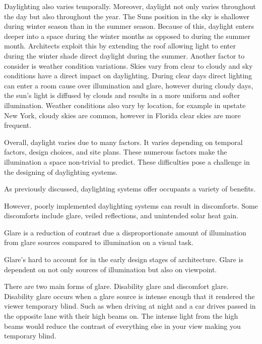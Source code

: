 Daylighting also varies temporally.
Moreover, daylight not only varies throughout the day but also throughout the year.
The Suns position in the sky is shallower during winter season than in the summer season. Because of this, daylight enters deeper into a space during the winter months as opposed to during the summer month.
Architects exploit this by extending the roof allowing light to enter during the winter shade direct daylight during the summer.
Another factor to consider is weather condition variations. Skies vary from clear to cloudy and sky conditions have a direct impact on daylighting. During clear days direct lighting can enter a room cause over illumination and glare, however during cloudy days, the sun's light is diffused by clouds and results in a more uniform and softer illumination.
Weather conditions also vary by location, for example in upstate New York, cloudy skies are common, however in Florida clear skies are more frequent.

Overall, daylight varies due to many factors. It varies depending on temporal factors, design choices, and site plans. These numerous factors make the illumination a space non-trivial to predict. These difficulties pose a challenge in the designing of daylighting systems.


As previously discussed, daylighting systems offer occupants a variety of benefits.

However, poorly implemented daylighting systems can result in discomforts. Some discomforts include glare, veiled reflections, and unintended solar heat gain.

Glare is a reduction of contrast due a disproportionate amount of illumination from glare sources compared to illumination on a visual task.

Glare's hard to account for in the early design stages of architecture. Glare is dependent on not only sources of illumination but also on viewpoint.

There are two main forms of glare. Disability glare and discomfort glare.
Disability glare occurs when a glare source is intense enough that it rendered the viewer temporary blind. Such as when driving at night and a car drives passed in the opposite lane with their high beams on. The intense light from the high beams would reduce the contrast of everything else in your view making you temporary blind.

